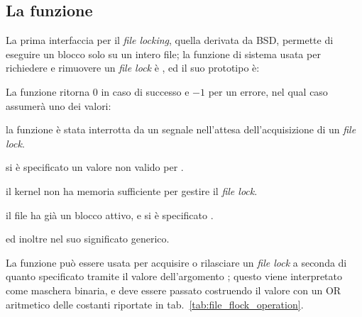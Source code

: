 

\subsection{La funzione } 
\label{sec:file_flock}

La prima interfaccia per il \textit{file locking}, quella derivata da BSD,
permette di eseguire un blocco solo su un intero file; la funzione di sistema
usata per richiedere e rimuovere un \textit{file lock} è , ed il
suo prototipo è:

\begin{funcproto}{
}

{La funzione ritorna $0$ in caso di successo e $-1$ per un errore, nel qual
  caso  assumerà uno dei valori: 
  \begin{errlist}
  \item[\errcode{EINTR}] la funzione è stata interrotta da un segnale
    nell'attesa dell'acquisizione di un \textit{file lock}.
  \item[\errcode{EINVAL}] si è specificato un valore non valido
    per .
  \item[\errcode{ENOLCK}] il kernel non ha memoria sufficiente per gestire il
    \textit{file lock}.
  \item[\errcode{EWOULDBLOCK}] il file ha già un blocco attivo, e si è
    specificato .
  \end{errlist}
  ed inoltre  nel suo significato generico.
}
\end{funcproto}

La funzione può essere usata per acquisire o rilasciare un \textit{file lock}
a seconda di quanto specificato tramite il valore dell'argomento
; questo viene interpretato come maschera binaria, e deve
essere passato costruendo il valore con un OR aritmetico delle costanti
riportate in tab.~\ref{tab:file_flock_operation}.

